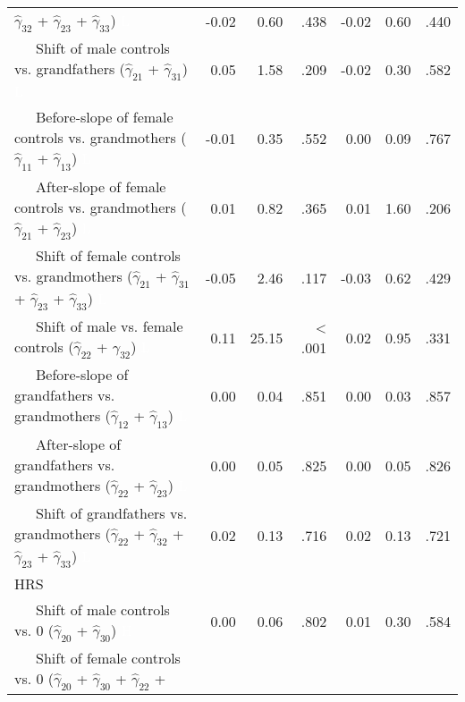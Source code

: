 \documentclass[
  english,
  man,floatsintext]{apa7}
\newenvironment{lltable}{\begin{landscape}\begin{center}\begin{ThreePartTable}}{\end{ThreePartTable}\end{center}\end{landscape}}
\begin{document}
\begin{lltable}
{\begin{longtable}{lrrrrrr}
                              $\hat{\gamma}_{32}$ + $\hat{\gamma}_{23}$ +
                              $\hat{\gamma}_{33}$) \textcolor{white}{L} & -0.02 & 0.60 & .438 & -0.02 & 0.60 & .440\\
\ \ \ Shift of male controls vs. grandfathers 
                              ($\hat{\gamma}_{21}$ + $\hat{\gamma}_{31}$) \textcolor{white}{L} & 0.05 & 1.58 & .209 & -0.02 & 0.30 & .582\\
\ \ \ Before-slope of female controls vs. grandmothers 
                              ($\hat{\gamma}_{11}$ + $\hat{\gamma}_{13}$) \textcolor{white}{L} & -0.01 & 0.35 & .552 & 0.00 & 0.09 & .767\\
\ \ \ After-slope of female controls vs. grandmothers 
                              ($\hat{\gamma}_{21}$ + $\hat{\gamma}_{23}$) \textcolor{white}{L} & 0.01 & 0.82 & .365 & 0.01 & 1.60 & .206\\
\ \ \ Shift of female controls vs. grandmothers 
                              ($\hat{\gamma}_{21}$ + $\hat{\gamma}_{31}$ + 
                              $\hat{\gamma}_{23}$ + $\hat{\gamma}_{33}$) \textcolor{white}{L} & -0.05 & 2.46 & .117 & -0.03 & 0.62 & .429\\
\ \ \ Shift of male vs. female controls 
                              ($\hat{\gamma}_{22}$ + $\hat{\gamma}_{32}$) \textcolor{white}{L} & 0.11 & 25.15 & < .001 & 0.02 & 0.95 & .331\\
\ \ \ Before-slope of grandfathers vs. grandmothers 
                              ($\hat{\gamma}_{12}$ + $\hat{\gamma}_{13}$) \textcolor{white}{L} & 0.00 & 0.04 & .851 & 0.00 & 0.03 & .857\\
\ \ \ After-slope of grandfathers vs. grandmothers 
                              ($\hat{\gamma}_{22}$ + $\hat{\gamma}_{23}$) \textcolor{white}{L} & 0.00 & 0.05 & .825 & 0.00 & 0.05 & .826\\
\ \ \ Shift of grandfathers vs. grandmothers 
                              ($\hat{\gamma}_{22}$ + $\hat{\gamma}_{32}$ + 
                              $\hat{\gamma}_{23}$ + $\hat{\gamma}_{33}$) \textcolor{white}{L} & 0.02 & 0.13 & .716 & 0.02 & 0.13 & .721\\
HRS &  &  &  &  &  & \\
\ \ \ Shift of male controls vs. 0 ($\hat{\gamma}_{20}$ + 
                              $\hat{\gamma}_{30}$) \textcolor{white}{H} & 0.00 & 0.06 & .802 & 0.01 & 0.30 & .584\\
\ \ \ Shift of female controls vs. 0 ($\hat{\gamma}_{20}$ + 
                              $\hat{\gamma}_{30}$ + $\hat{\gamma}_{22}$ + 

\end{longtable}}
\end{lltable}
\end{document}
